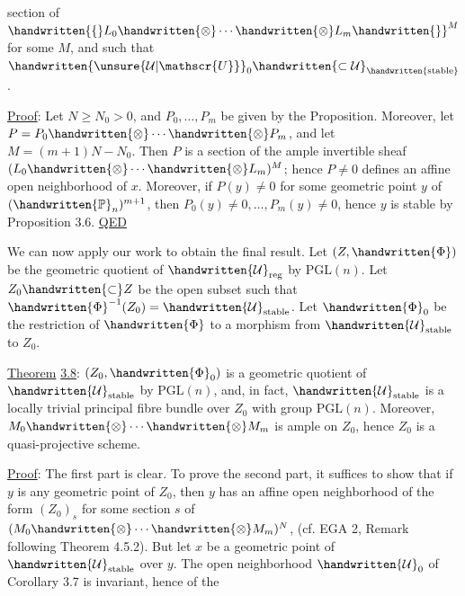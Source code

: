 section of $\handwritten{\{}L_0\handwritten{\otimes}\cdots\handwritten{\otimes}L_m\handwritten{\}}^M$ for some $M$, and such that $\handwritten{\unsure{\mathcal{U}|\mathscr{U}}}_0\handwritten{\subset\mathcal{U}}_{\handwritten{\mathrm{stable}}}$.

\uline{Proof}: Let $N\geq N_0>0$, and $P_0,\ldots,P_m$ be given by the
Proposition. Moreover, let $P=P_0\handwritten{\otimes}\cdots\handwritten{\otimes}P_m$, and let $M=(m+1)N-N_0$.
Then $P$ is a section of the ample invertible sheaf $(L_0\handwritten{\otimes}\cdots\handwritten{\otimes}L_m)^M$;
hence $P\ne0$ defines an affine open neighborhood of $x$. Moreover,
if $P(y)\ne0$ for some geometric point $y$ of $(\handwritten{\mathbb{P}}_n)^{m+1}$, then
$P_0(y)\ne0,\ldots,P_m(y)\ne0$, hence $y$ is stable by Proposition 3.6.
\hfill\uline{QED}

We can now apply our work to obtain the final result. Let $(Z,\handwritten{\Phi})$
be the geometric quotient of $\handwritten{\mathcal{U}}_{\mathrm{reg}}$ by $\mathrm{PGL}(n)$. Let $Z_0\handwritten{\subset}Z$ be
the open subset such that $\handwritten{\Phi}^{-1}(Z_0)=\handwritten{\mathcal{U}}_{\mathrm{stable}}$. Let $\handwritten{\Phi}_0$ be the
restriction of $\handwritten{\Phi}$ to a morphism from $\handwritten{\mathcal{U}}_{\mathrm{stable}}$ to $Z_0$.

\uline{Theorem} \uline{3.8}: $(Z_0,\handwritten{\Phi}_0)$ is a geometric quotient of $\handwritten{\mathcal{U}}_{\mathrm{stable}}$ by
$\mathrm{PGL}(n)$, and, in fact, $\handwritten{\mathcal{U}}_{\mathrm{stable}}$ is a locally trivial principal
fibre bundle over $Z_0$ with group $\mathrm{PGL}(n)$. Moreover, $M_0\handwritten{\otimes}\cdots\handwritten{\otimes}M_m$
is ample on $Z_0$, hence $Z_0$ is a quasi-projective scheme.

\uline{Proof}: The first part is clear. To prove the second part, it
suffices to show that if $y$ is any geometric point of $Z_0$, then $y$
has an affine open neighborhood of the form $(Z_0)_s$ for some section
$s$ of $(M_0\handwritten{\otimes}\cdots\handwritten{\otimes}M_m)^N$, (cf. EGA 2, Remark following Theorem 4.5.2).
But let $x$ be a geometric point of $\handwritten{\mathcal{U}}_{\mathrm{stable}}$ over $y$. The open
neighborhood $\handwritten{\mathcal{U}}_0$ of Corollary 3.7 is invariant, hence of the

